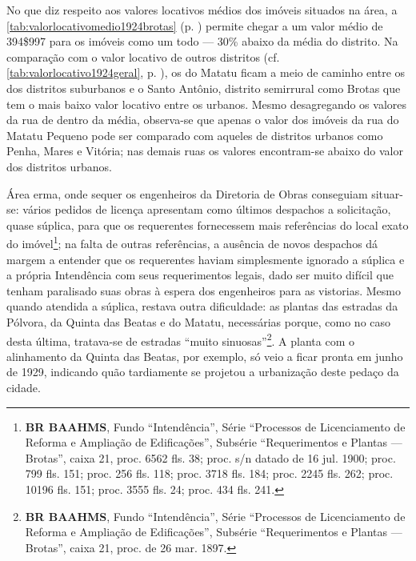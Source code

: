 
No que diz respeito aos valores locativos médios dos imóveis situados na área, a \autoref{tab:valorlocativomedio1924brotas} (p. \pageref{tab:valorlocativomedio1924brotas}) permite chegar a um valor médio de 394\$997 para os imóveis como um todo --- 30\% abaixo da média do distrito. Na comparação com o valor locativo de outros distritos (cf. \autoref{tab:valorlocativo1924geral}, p. \pageref{tab:valorlocativo1924geral}), os do Matatu ficam a meio de caminho entre os dos distritos suburbanos e o Santo Antônio, distrito semirrural como Brotas que tem o mais baixo valor locativo entre os urbanos. Mesmo desagregando os valores da rua de dentro da média, observa-se que apenas o valor dos imóveis da rua do Matatu Pequeno pode ser comparado com aqueles de distritos urbanos como Penha, Mares e Vitória; nas demais ruas os valores encontram-se abaixo do valor dos distritos urbanos.





Área erma, onde sequer os engenheiros da Diretoria de Obras conseguiam situar-se: vários pedidos de licença apresentam como últimos despachos a solicitação, quase súplica, para que os requerentes fornecessem mais referências do local exato do imóvel\footnote{\textbf{BR BAAHMS}, Fundo ``Intendência'', Série ``Processos de Licenciamento de Reforma e Ampliação de Edificações'', Subsérie ``Requerimentos e Plantas --- Brotas'', caixa 21, proc. 6562 fls. 38; proc. s/n datado de 16 jul. 1900; proc. 799 fls. 151; proc. 256 fls. 118; proc. 3718 fls. 184; proc. 2245 fls. 262; proc. 10196 fls. 151; proc. 3555 fls. 24; proc. 434 fls. 241.}; na falta de outras referências, a ausência de novos despachos dá margem a entender que os requerentes haviam simplesmente ignorado a súplica e a própria Intendência com seus requerimentos legais, dado ser muito difícil que tenham paralisado suas obras à espera dos engenheiros para as vistorias. Mesmo quando atendida a súplica, restava outra dificuldade: as plantas das estradas da Pólvora, da Quinta das Beatas e do Matatu, necessárias porque, como no caso desta última, tratava-se de estradas ``muito sinuosas''\footnote{\textbf{BR BAAHMS}, Fundo ``Intendência'', Série ``Processos de Licenciamento de Reforma e Ampliação de Edificações'', Subsérie ``Requerimentos e Plantas --- Brotas'', caixa 21, proc. de 26 mar. 1897.}. A planta com o alinhamento da Quinta das Beatas, por exemplo, só veio a ficar pronta em junho de 1929, indicando quão tardiamente se projetou a urbanização deste pedaço da cidade.

